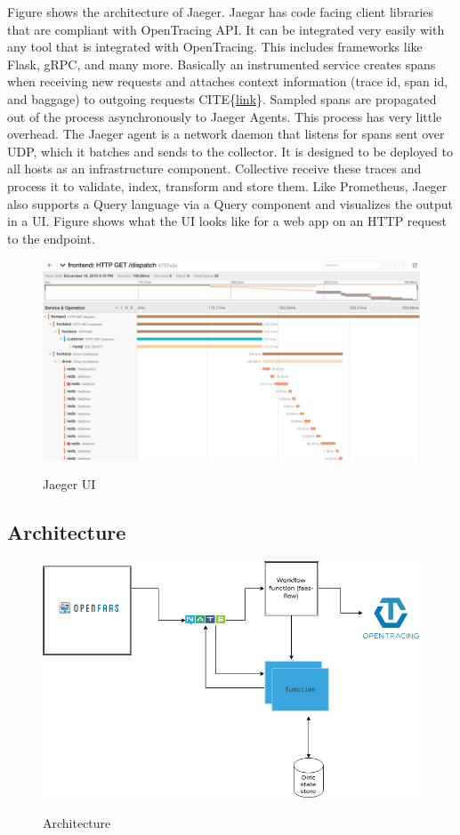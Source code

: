 \documentclass[12pt,titlepage]{article}
\begin{document}
Figure shows the architecture of Jaeger. Jaegar has code facing client libraries
that are compliant with OpenTracing API. It can be integrated very easily with
any tool that is integrated with OpenTracing. This includes frameworks like
Flask, gRPC, and many more. Basically an instrumented service creates spans when
receiving new requests and attaches context information (trace id, span id, and
baggage) to outgoing requests CITE\{\href{https://www.jaegertracing.io/docs/1.14/architecture/}{link}\}. Sampled spans are propagated out of
the process asynchronously to Jaeger Agents. This process has very little
overhead. The Jaeger agent is a network daemon that listens for spans sent over
UDP, which it batches and sends to the collector. It is designed to be deployed
to all hosts as an infrastructure component. Collective receive these traces and
process it to validate, index, transform and store them. Like Prometheus, Jaeger
also supports a Query language via a Query component and visualizes the output
in a UI. Figure shows what the UI looks like for a web app on an HTTP request to
the endpoint. 
\begin{figure}[!h]
    \caption{Jaeger UI}
    \centering
    \includegraphics[width=130mm]{./thesis_images/jaeger_traces.png}
    \label{fig:jaeger_traces}
\end{figure}

\subsection{Architecture}
\label{sec:org49fec30}
\begin{figure}[!h]
    \caption{Architecture}
    \centering
    \includegraphics[width=130mm]{./thesis_images/architecture.png}
    \label{fig:arch}
\end{figure}
\end{document}
